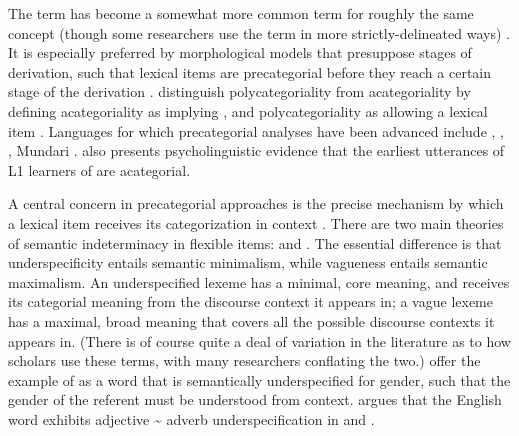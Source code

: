 The term  has become a somewhat more common term for roughly the same concept (though some researchers use the term in more strictly-delineated ways) \parencites[357, 362--364]{EvansOsada2005}{Bisang2008}{Bisang2013}. It is especially preferred by morphological models that presuppose stages of derivation, such that lexical items are precategorial before they reach a certain stage of the derivation \parencites{HalleMarantz1994}{Arad2005}{McGinnisArchibald2016}{Siddiqi2018}. \textcite[5]{VapnarskyVeneziano2017a} distinguish polycategoriality from acategoriality by defining acategoriality as implying , and polycategoriality as allowing a lexical item . Languages for which precategorial analyses have been advanced include  \parencite{Haag2017},  \parencite{McGregor2013},  \parencite{FranchettoSantos2017}, Mundari \parencite{HengeveldRijkhoff2005}. \textcite{Pfeiler2017} also presents psycholinguistic evidence that the earliest utterances of L1 learners of  are acategorial.

A central concern in precategorial approaches is the precise mechanism by which a lexical item receives its categorization in context \parencite[§3.7]{HengeveldRijkhoffSiewierska2004}. There are two main theories of semantic indeterminacy in flexible items:  \parencites{Farrell2001}{RijkhoffLier2013} and  \parencites{Tuggy1993}{HengeveldRijkhoffSiewierska2004}{HengeveldRijkhoff2005}. The essential difference is that underspecificity entails semantic minimalism, while vagueness entails semantic maximalism. An underspecified lexeme has a minimal, core meaning, and receives its categorial meaning from the discourse context it appears in; a vague lexeme has a maximal, broad meaning that covers all the possible discourse contexts it appears in. (There is of course quite a deal of variation in the literature as to how scholars use these terms, with many researchers conflating the two.) \textcite[414]{HengeveldRijkhoff2005} offer the example of   as a word that is semantically underspecified for gender, such that the gender of the referent must be understood from context. \textcite{Denison2018} argues that the English word  exhibits adjective \~{} adverb underspecification in  and .

